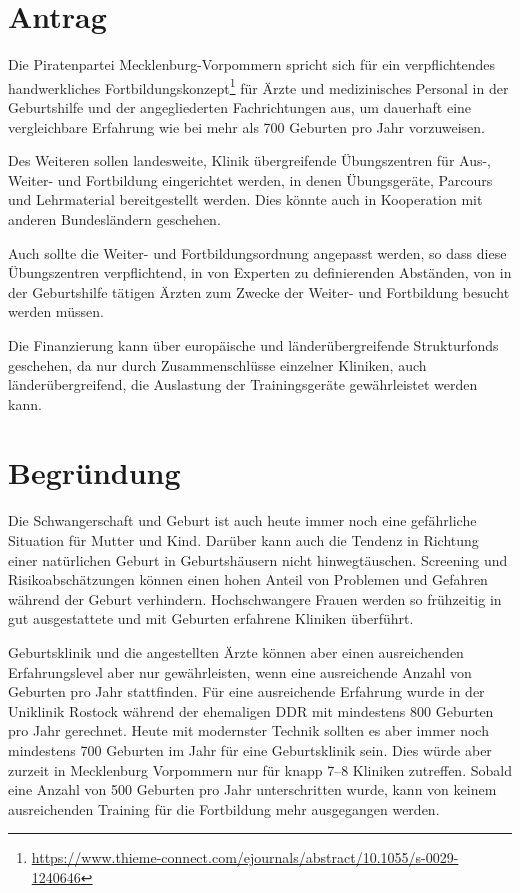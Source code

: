 \section{Antrag}

Die Piratenpartei Mecklenburg-Vorpommern spricht sich für ein verpflichtendes handwerkliches Fortbildungskonzept\footnote{\url{https://www.thieme-connect.com/ejournals/abstract/10.1055/s-0029-1240646}} für Ärzte und medizinisches Personal in der Geburtshilfe und der angegliederten Fachrichtungen aus, um dauerhaft eine vergleichbare Erfahrung wie bei mehr als 700 Geburten pro Jahr vorzuweisen.

Des Weiteren sollen landesweite, Klinik übergreifende Übungszentren für Aus-, Weiter- und Fortbildung eingerichtet werden, in denen Übungsgeräte, Parcours und Lehrmaterial bereitgestellt werden. Dies könnte auch in Kooperation mit anderen Bundesländern geschehen.

Auch sollte die Weiter- und Fortbildungsordnung angepasst werden, so dass diese Übungszentren verpflichtend, in von Experten zu definierenden Abständen, von in der Geburtshilfe tätigen Ärzten zum Zwecke der Weiter- und Fortbildung besucht werden müssen.

Die Finanzierung kann über europäische und länderübergreifende Strukturfonds geschehen, da nur durch Zusammenschlüsse einzelner Kliniken, auch länderübergreifend, die Auslastung der Trainingsgeräte gewährleistet werden kann.

\section{Begründung}

Die Schwangerschaft und Geburt ist auch heute immer noch eine gefährliche Situation für Mutter und Kind. Darüber kann auch die Tendenz in Richtung einer natürlichen Geburt in Geburtshäusern nicht hinwegtäuschen. Screening und Risikoabschätzungen können einen hohen Anteil von Problemen und Gefahren während der Geburt verhindern. Hochschwangere Frauen werden so frühzeitig in gut ausgestattete und mit Geburten erfahrene Kliniken überführt.

Geburtsklinik und die angestellten Ärzte können aber einen ausreichenden Erfahrungslevel aber nur gewährleisten, wenn eine ausreichende Anzahl von Geburten pro Jahr stattfinden. Für eine ausreichende Erfahrung wurde in der Uniklinik Rostock während der ehemaligen DDR mit mindestens 800 Geburten pro Jahr gerechnet. Heute mit modernster Technik sollten es aber immer noch mindestens 700 Geburten im Jahr für eine Geburtsklinik sein. Dies würde aber zurzeit in Mecklenburg Vorpommern nur für knapp 7--8 Kliniken zutreffen. Sobald eine Anzahl von 500 Geburten pro Jahr unterschritten wurde, kann von keinem ausreichenden Training für die Fortbildung mehr ausgegangen werden.

